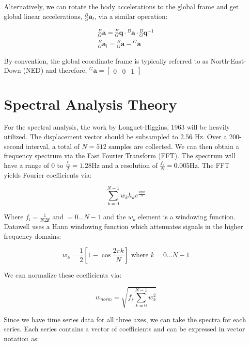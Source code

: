 Alternatively, we can rotate the body accelerations to the global frame and get global linear accelerations, ${}^B_G\pmb{a}_l$, via a similar operation:

\begin{gather}
    {}^B_G\pmb{a} = {}^B_G\pmb{q} \cdot {}^B\pmb{a} \cdot {}^B_G\pmb{q}^{-1} \\
    {}^B_G\pmb{a}_l = {}^B_G\pmb{a} - {}^G\pmb{a}
\end{gather}

By convention, the global coordinate frame is typically referred to as North-East-Down (NED) and therefore, ${}^G\pmb{a} = \begin{bmatrix} 0 & 0 & 1 \end{bmatrix}$

\section{Spectral Analysis Theory}

For the spectral analysis, the work by Longuet-Higgins, 1963 will be heavily utilized. 
The displacement vector should be subsampled to 2.56 Hz. 
Over a 200-second interval, a total of $N=512$ samples are collected. 
We can then obtain a frequency spectrum via the Fast Fourier Transform (FFT). 
The spectrum will have a range of $0$ to $\frac{f_s}{2}=1.28 \text{Hz}$ and a resolution of $\frac{f_s}{N}=0.005 \text{Hz}$.
The FFT yields Fourier coefficients via:

\begin{equation}
    \sum_{k=0}^{N-1} w_k h_k e^{\frac{2\pi kl}{N}}
\end{equation}

Where $f_l=\frac{1}{N\Delta t}$ and $= 0 \ldots N-1$ and the $w_k$ element is a windowing function. 
Datawell uses a Hann windowing function which attenuates signals in the higher frequency domains:

\begin{equation}
    w_k = \frac{1}{2} [1-\cos{\frac{2\pi k}{N}}] \text{ where } k=0 \ldots N-1
\end{equation}

We can normalize these coefficients via:

\begin{equation}
    w_{norm} = \sqrt{f_s \sum_{k=0}^{N-1}w_k^2}
\end{equation}

Since we have time series data for all three axes, we can take the spectra for each series. Each series contains a vector of coefficients and can be expressed in vector notation as:

